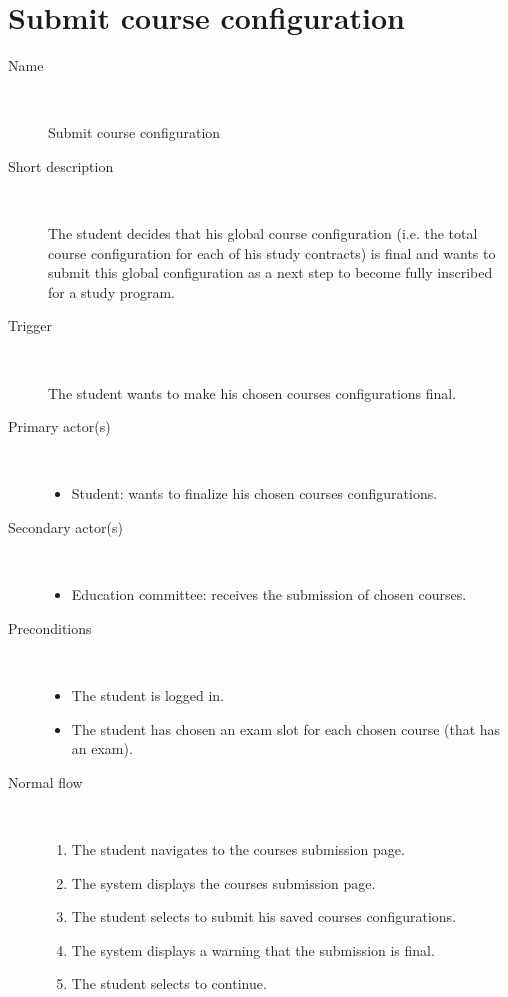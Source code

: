 \section{Submit course configuration}

\begin{description}
	\item[Name] \
		\par Submit course configuration
	\item[Short description] \ 
			\par The student decides that his global course configuration (i.e. the total
			course configuration for each of his study contracts) is final and wants to
			submit this global configuration as a next step to become fully inscribed for
			a study program. 
	\item[Trigger] \ 
			\par The student wants to make his chosen courses configurations final.
	\item[Primary actor(s)] \ 
		\begin{itemize}
		  \item Student: wants to finalize his chosen courses configurations.
		\end{itemize}
	\item[Secondary actor(s)] \ 
		\begin{itemize}
		  \item Education committee: receives the submission of chosen courses.
		\end{itemize} 
	\item[Preconditions] \ 
	\begin{itemize}
		\item The student is logged in.
		\item The student has chosen an exam slot for each chosen course (that has an
		exam).
	\end{itemize}
	\item[Normal flow] \ 
	\begin{enumerate}
	  	\item The student navigates to the courses submission page.
	  	\item The system displays the courses submission page.
	  	\item The student selects to submit his saved courses configurations.
	  	\item The system displays a warning that the submission is final.
	  	\item The student selects to continue.

\end{enumerate}
\end{description}
